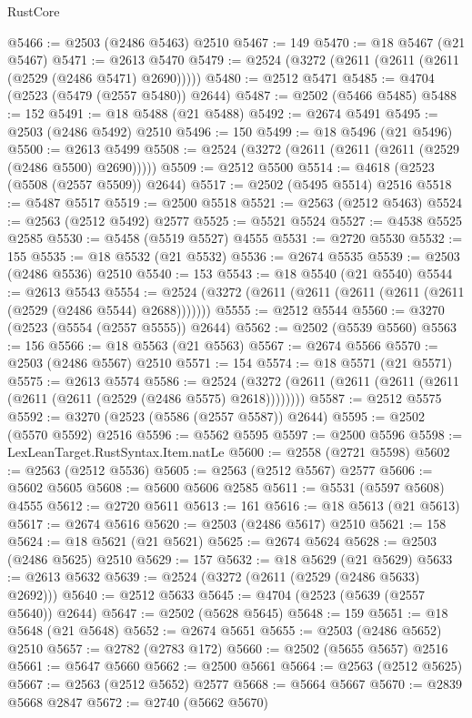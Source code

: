 \begin{lexlean}{RustCore}
\begin{coremodule}
@5466 := @2503 (@2486 @5463) @2510
@5467 := 149
@5470 := @18 @5467 (@21 @5467)
@5471 := @2613 @5470
@5479 := @2524 (@3272 (@2611 (@2611 (@2611 (@2529 (@2486 @5471) @2690)))))
@5480 := @2512 @5471
@5485 := @4704 (@2523 (@5479 (@2557 @5480)) @2644)
@5487 := @2502 (@5466 @5485)
@5488 := 152
@5491 := @18 @5488 (@21 @5488)
@5492 := @2674 @5491
@5495 := @2503 (@2486 @5492) @2510
@5496 := 150
@5499 := @18 @5496 (@21 @5496)
@5500 := @2613 @5499
@5508 := @2524 (@3272 (@2611 (@2611 (@2611 (@2529 (@2486 @5500) @2690)))))
@5509 := @2512 @5500
@5514 := @4618 (@2523 (@5508 (@2557 @5509)) @2644)
@5517 := @2502 (@5495 @5514) @2516
@5518 := @5487 @5517
@5519 := @2500 @5518
@5521 := @2563 (@2512 @5463)
@5524 := @2563 (@2512 @5492) @2577
@5525 := @5521 @5524
@5527 := @4538 @5525 @2585
@5530 := @5458 (@5519 @5527) @4555
@5531 := @2720 @5530
@5532 := 155
@5535 := @18 @5532 (@21 @5532)
@5536 := @2674 @5535
@5539 := @2503 (@2486 @5536) @2510
@5540 := 153
@5543 := @18 @5540 (@21 @5540)
@5544 := @2613 @5543
@5554 := @2524 (@3272 (@2611 (@2611 (@2611 (@2611 (@2611 (@2529 (@2486 @5544) @2688)))))))
@5555 := @2512 @5544
@5560 := @3270 (@2523 (@5554 (@2557 @5555)) @2644)
@5562 := @2502 (@5539 @5560)
@5563 := 156
@5566 := @18 @5563 (@21 @5563)
@5567 := @2674 @5566
@5570 := @2503 (@2486 @5567) @2510
@5571 := 154
@5574 := @18 @5571 (@21 @5571)
@5575 := @2613 @5574
@5586 := @2524 (@3272 (@2611 (@2611 (@2611 (@2611 (@2611 (@2611 (@2529 (@2486 @5575) @2618))))))))
@5587 := @2512 @5575
@5592 := @3270 (@2523 (@5586 (@2557 @5587)) @2644)
@5595 := @2502 (@5570 @5592) @2516
@5596 := @5562 @5595
@5597 := @2500 @5596
@5598 := LexLeanTarget.RustSyntax.Item.natLe
@5600 := @2558 (@2721 @5598)
@5602 := @2563 (@2512 @5536)
@5605 := @2563 (@2512 @5567) @2577
@5606 := @5602 @5605
@5608 := @5600 @5606 @2585
@5611 := @5531 (@5597 @5608) @4555
@5612 := @2720 @5611
@5613 := 161
@5616 := @18 @5613 (@21 @5613)
@5617 := @2674 @5616
@5620 := @2503 (@2486 @5617) @2510
@5621 := 158
@5624 := @18 @5621 (@21 @5621)
@5625 := @2674 @5624
@5628 := @2503 (@2486 @5625) @2510
@5629 := 157
@5632 := @18 @5629 (@21 @5629)
@5633 := @2613 @5632
@5639 := @2524 (@3272 (@2611 (@2529 (@2486 @5633) @2692)))
@5640 := @2512 @5633
@5645 := @4704 (@2523 (@5639 (@2557 @5640)) @2644)
@5647 := @2502 (@5628 @5645)
@5648 := 159
@5651 := @18 @5648 (@21 @5648)
@5652 := @2674 @5651
@5655 := @2503 (@2486 @5652) @2510
@5657 := @2782 (@2783 @172)
@5660 := @2502 (@5655 @5657) @2516
@5661 := @5647 @5660
@5662 := @2500 @5661
@5664 := @2563 (@2512 @5625)
@5667 := @2563 (@2512 @5652) @2577
@5668 := @5664 @5667
@5670 := @2839 @5668 @2847
@5672 := @2740 (@5662 @5670)

\end{coremodule}
\end{lexlean}
